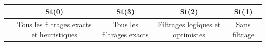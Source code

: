 \begin{table}[H]
	\centering
	\small
	\begin{tabular}{|r|rrrr|rrr|rr|rr|}
		\toprule
		\hline
		\rowcolor{cyan}	&\multicolumn{4}{c|}{\textbf{St(0)}} & \multicolumn{3}{c|}{\textbf{St(3)}}&\multicolumn{2}{c|}{\textbf{St(2)}}&\multicolumn{2}{c|}{\textbf{St(1)}} \\ \hline
		\midrule
		
		\hline
		\rowcolor{cyan}	&\multicolumn{4}{c|}{ \tiny{Tous les filtrages exacts et heuristiques}} & \multicolumn{3}{c|}{\tiny{Tous les filtrages exacts}}&\multicolumn{2}{c|}{\tiny{Filtrages logiques et optimistes}}&\multicolumn{2}{c|}{\tiny{Sans filtrage}}
		\\ \hline
		\midrule
		

\end{tabular}
\end{table}
